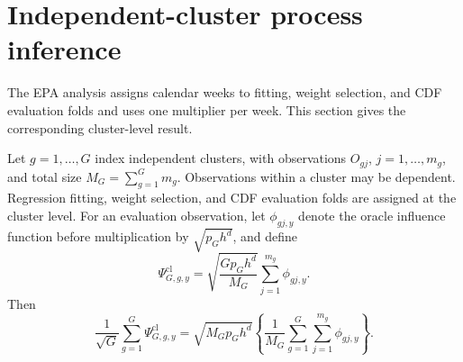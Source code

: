 \section{Independent-cluster process inference}
\label{sec:supp-cluster}

The EPA analysis assigns calendar weeks to fitting, weight selection, and CDF evaluation folds and uses one multiplier per week. This section gives the corresponding cluster-level result.

Let \(g=1,\ldots,G\) index independent clusters, with observations \(O_{gj}\), \(j=1,\ldots,m_g\), and total size \(M_G=\sum_{g=1}^Gm_g\). Observations within a cluster may be dependent. Regression fitting, weight selection, and CDF evaluation folds are assigned at the cluster level. For an evaluation observation, let \(\phi_{gj,y}\) denote the oracle influence function before multiplication by \(\sqrt{p_Gh^d}\), and define
\begin{equation}
\Psi_{G,g,y}^{\mathrm{cl}}
=
\sqrt{\frac{Gp_Gh^d}{M_G}}
\sum_{j=1}^{m_g}\phi_{gj,y}.
\label{eq:cluster-influence}
\end{equation}
Then
\[
\frac1{\sqrt G}
\sum_{g=1}^G\Psi_{G,g,y}^{\mathrm{cl}}
=
\sqrt{M_Gp_Gh^d}
\left\{
\frac1{M_G}
\sum_{g=1}^G\sum_{j=1}^{m_g}\phi_{gj,y}
\right\}.
\]

